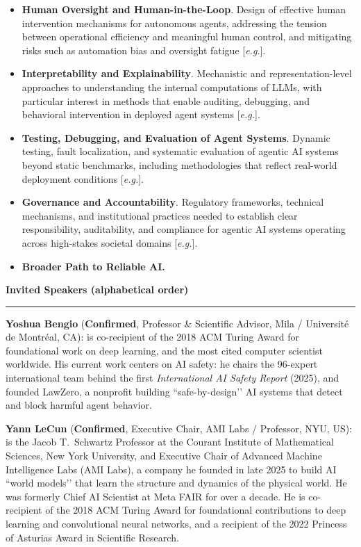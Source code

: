 \documentclass{article}
\newcommand{\confirmed}{\textcolor{green!60!black}{\textbf{Confirmed}}}
\newcommand{\eg}{\textit{e.g.}}
\newcommand{\sectiontitle}[1]{\noindent\textbf{\textcolor{neuripsblue}{#1}}\vspace{0.1cm}\hrule\vspace{0.2cm}}
\begin{document}
\begin{itemize}[leftmargin=10pt,itemsep=1pt,topsep=2pt]
\item \textbf{Human Oversight and Human-in-the-Loop}. Design of effective human intervention mechanisms for autonomous agents, addressing the tension between operational efficiency and meaningful human control, and mitigating risks such as automation bias and oversight fatigue [\eg \cite{jimenez2024swebench, bai2022constitutional}].

\item \textbf{Interpretability and Explainability}. Mechanistic and representation-level approaches to understanding the internal computations of LLMs, with particular interest in methods that enable auditing, debugging, and behavioral intervention in deployed agent systems [\eg \cite{conmy2023automated, tigges2024llm}].

\item \textbf{Testing, Debugging, and Evaluation of Agent Systems}. Dynamic testing, fault localization, and systematic evaluation of agentic AI systems beyond static benchmarks, including methodologies that reflect real-world deployment conditions [\eg \cite{jimenez2024swebench, xia2025agentless, xia2023automated}].

\item \textbf{Governance and Accountability}. Regulatory frameworks, technical mechanisms, and institutional practices needed to establish clear responsibility, auditability, and compliance for agentic AI systems operating across high-stakes societal domains [\eg \cite{mitchell2019model, nist2023airmf}].
\item \textbf{Broader Path to Reliable AI.}
\end{itemize}


\sectiontitle{Invited Speakers (alphabetical order)}
\vspace{-2pt}
 \textbf{Yoshua Bengio} (\confirmed, Professor \& Scientific Advisor, Mila / Université de Montréal, CA): is co-recipient of the 2018 ACM Turing Award for foundational work on deep learning, and the most cited computer scientist worldwide. His current work centers on AI safety: he chairs the 96-expert international team behind the first \textit{International AI Safety Report} (2025), and founded LawZero, a nonprofit building ``safe-by-design’’ AI systems that detect and block harmful agent behavior.

\textbf{Yann LeCun} (\confirmed, Executive Chair, AMI Labs / Professor, NYU, US): is the Jacob T.~Schwartz Professor at the Courant Institute of Mathematical Sciences, New York University, and Executive Chair of Advanced Machine Intelligence Labs (AMI Labs), a company he founded in late 2025 to build AI ``world models’’ that learn the structure and dynamics of the physical world. He was formerly Chief AI Scientist at Meta FAIR for over a decade. He is co-recipient of the 2018 ACM Turing Award for foundational contributions to deep learning and convolutional neural networks, and a recipient of the 2022 Princess of Asturias Award in Scientific Research.
     
\end{document}
